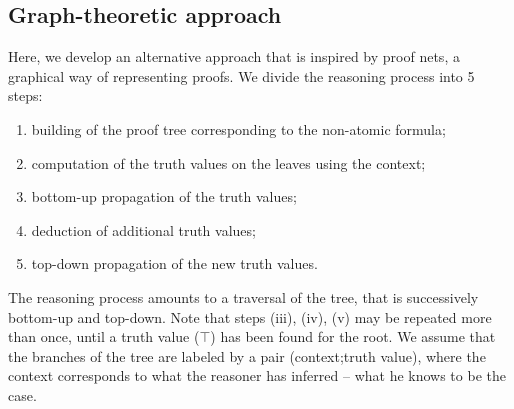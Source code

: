 \documentclass[french]{article}
\begin{document}
\subsection{Graph-theoretic approach}
Here, we develop an alternative approach that is inspired by proof nets, a graphical way of representing proofs. We divide the reasoning process into 5 steps:
\begin{enumerate}[label=(\roman*)]
	\item building of the proof tree corresponding to the non-atomic formula;
	\item computation of the truth values on the leaves using the context;
	\item bottom-up propagation of the truth values;
	\item deduction of additional truth values;
	\item top-down propagation of the new truth values.
\end{enumerate}
The reasoning process amounts to a traversal of the tree, that is successively bottom-up and top-down. Note that steps (iii), (iv), (v) may be repeated more than once, until a truth value ($\top$) has been found for the root. We assume that the branches of the tree are labeled by a pair (context;truth value), where the context corresponds to what the reasoner has inferred -- what he knows to be the case.


\end{document}
